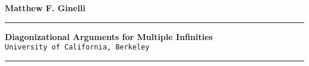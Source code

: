 \documentclass[a4paper,12pt]{article}
\newcommand{\titleline}[1]{\noindent\rule{\textwidth}{#1}}
\begin{document}
\vspace*{\fill}

\begin{center}

\textbf{Matthew F. Ginelli}

\end{center}
\titleline{5pt}

\begin{center}
\bigskip
\textbf{Diagonizational Arguments for Multiple Infinities}\\
\smallskip
\texttt{University of California, Berkeley}
\medskip
\end{center}

\titleline{5pt}
\vspace*{\fill}
\end{document}
